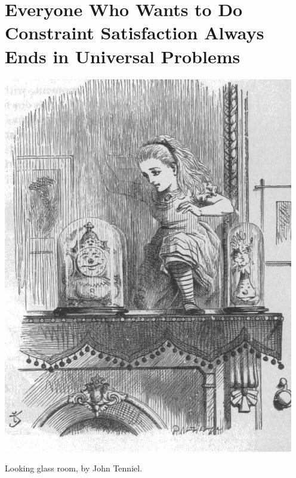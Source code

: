 \section{Everyone Who Wants to Do Constraint Satisfaction Always Ends in Universal Problems}

\begin{marginfigure}
	\centering
	\includegraphics[width=\linewidth]{fig/intro/aliceroom2.jpg}
	\caption{Looking glass room, by John Tenniel.}
\end{marginfigure}

